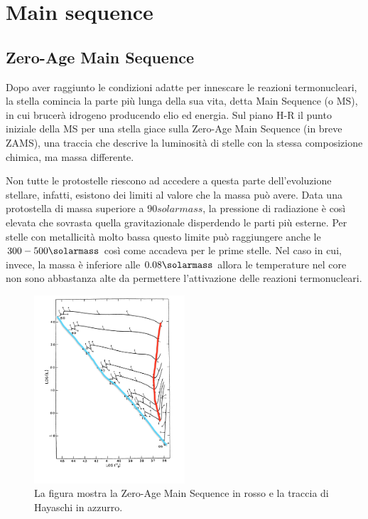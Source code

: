 \section{Main sequence}\label{sec:main-sequence}
\subsection{Zero-Age Main Sequence}
Dopo aver raggiunto le condizioni adatte per innescare le reazioni termonucleari, la stella comincia la parte più lunga della sua vita, detta Main Sequence (o MS), in cui brucerà idrogeno producendo elio ed energia. Sul piano H-R il punto iniziale della MS per una stella giace sulla Zero-Age Main Sequence (in breve ZAMS), una traccia che descrive la luminosità di stelle con la stessa composizione chimica, ma massa differente.

Non tutte le protostelle riescono ad accedere a questa parte dell'evoluzione stellare, infatti, esistono dei limiti al valore che la massa può avere. Data una protostella di massa superiore a $90 \si{solarmass}$, la pressione di radiazione è così elevata che sovrasta quella gravitazionale disperdendo le parti più esterne. Per stelle con metallicità molto bassa questo limite può raggiungere anche le $300 - 500 \si{\solarmass}$ così come accadeva per le prime stelle. Nel caso in cui, invece, la massa è inferiore alle $0.08 \si{\solarmass}$ allora le temperature nel core non sono abbastanza alte da permettere l'attivazione delle reazioni termonucleari.

\begin{figure}
    \centering
    \includegraphics[width = 0.5\textwidth]{immagini/ZAMS.png}
    \caption{La figura mostra la Zero-Age Main Sequence in rosso e la traccia di Hayaschi in azzurro.}\label{fig:ZAMS}
\end{figure}

